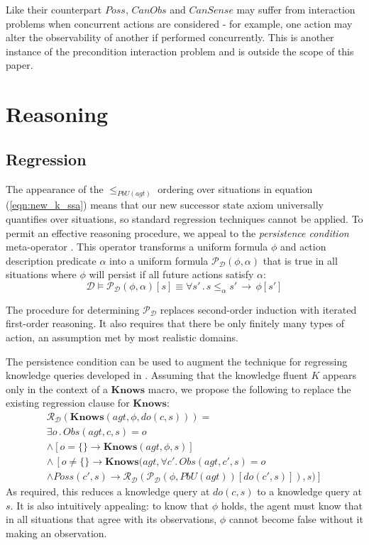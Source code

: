 \documentclass{ifaamas-submission}
\begin{document}
Like their counterpart $Poss$, $CanObs$ and $CanSense$ may suffer
from interaction problems when concurrent actions are considered -
for example, one action may alter the observability of another if
performed concurrently. This is another instance of the precondition
interaction problem \cite{reiter96sc_nat_conc,pinto94temporal} and
is outside the scope of this paper.

\section{Reasoning}

\label{sec:Reasoning}


\subsection{Regression}

The appearance of the $\leq_{PbU(agt)}$ ordering over situations
in equation (\ref{eqn:new_k_ssa}) means that our new successor state
axiom universally quantifies over situations, so standard regression
techniques cannot be applied. To permit an effective reasoning procedure,
we appeal to the \emph{persistence condition} meta-operator \cite{kelly07sc_persistence}.
This operator transforms a uniform formula $\phi$ and action description
predicate $\alpha$ into a uniform formula $\mathcal{P}_{\mathcal{D}}(\phi,\alpha)$
that is true in all situations where $\phi$ will persist if all future
actions satisfy $\alpha$:\[
\mathcal{D}\models\mathcal{P}_{\mathcal{D}}(\phi,\alpha)[s]\equiv\forall s'\,.\, s\leq_{\alpha}s'\,\rightarrow\,\phi[s']\]


The procedure for determining $\mathcal{P}_{\mathcal{D}}$ replaces
second-order induction with iterated first-order reasoning. It also
requires that there be only finitely many types of action, an assumption
met by most realistic domains.

The persistence condition can be used to augment the technique for
regressing knowledge queries developed in \cite{scherl03sc_knowledge}.
Assuming that the knowledge fluent $K$ appears only in the context
of a $\mathbf{Knows}$ macro, we propose the following to replace
the existing regression clause for $\mathbf{Knows}$:\begin{multline}
\mathcal{R}_{\mathcal{D}}(\mathbf{Knows}(agt,\phi,do(c,s)))=\\
\exists o\,.\, Obs(agt,c,s)=o\\
\wedge\left[o=\{\}\rightarrow\mathbf{Knows}(agt,\phi,s)\right]\\
\wedge\,\left[o\neq\{\}\rightarrow\mathbf{Knows}(agt,\forall c'.\, Obs(agt,c',s)=o\right.\\
\left.\wedge Poss(c',s)\rightarrow\mathcal{R}_{\mathcal{D}}(\mathcal{P}_{\mathcal{D}}(\phi,PbU(agt))[do(c',s)]),s)\right]\label{eqn:R_do_c_s}\end{multline}
 As required, this reduces a knowledge query at $do(c,s)$ to a knowledge
query at $s$. It is also intuitively appealing: to know that $\phi$
holds, the agent must know that in all situations that agree with
its observations, $\phi$ cannot become false without it making an
observation.
\end{document}
